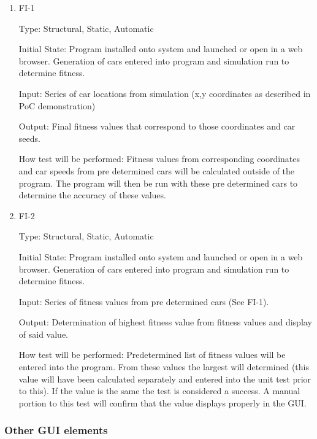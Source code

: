 \documentclass[12pt, titlepage]{article}
\begin{document}
\begin{enumerate}

\item{FI-1\\}

Type: Structural, Static, Automatic
					
Initial State: Program installed onto system and launched or open in a web 
browser. Generation of cars entered into program and simulation run to determine 
fitness.
					
Input: Series of car locations from simulation (x,y coordinates as described in 
PoC 
demonstration)
					
Output: Final fitness values that correspond to those coordinates and car seeds.
					
How test will be performed: Fitness values from corresponding coordinates and 
car speeds from pre determined cars will be calculated outside of the program. 
The program will then be run with these pre determined cars to determine the 
accuracy of these values. 
					
\item{FI-2\\}

Type: Structural, Static, Automatic
					
Initial State: Program installed onto system and launched or open in a web 
browser. Generation of cars entered into program and simulation run to determine 
fitness.
					
Input: Series of fitness values from pre determined cars (See FI-1).
					
Output: Determination of highest fitness value from fitness values and display 
of said value.
					
How test will be performed:  Predetermined list of fitness values will be 
entered into the program. From these values the largest will determined (this 
value will have been calculated separately and entered into the unit test prior 
to this). If the value is the same the test is considered a success. A manual 
portion to this test will confirm that the value displays properly in the GUI.

\end{enumerate}

\subsubsection{Other GUI elements}
\end{document}
